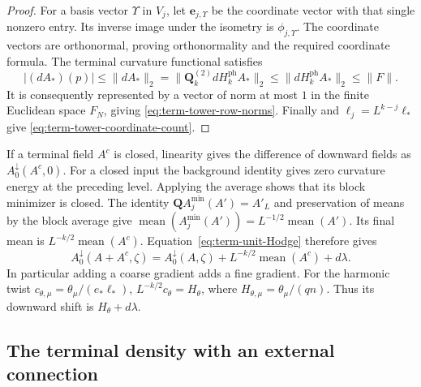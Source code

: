 \begin{proof}
For a basis vector $\Upsilon$ in $V_j$, let
$\mathbf e_{j,\Upsilon}$ be the coordinate vector
with that single nonzero entry.
Its inverse image under the isometry is
$\phi_{j,\Upsilon}$.
The coordinate vectors are orthonormal, proving
orthonormality and the required coordinate formula.
The terminal curvature functional satisfies
\[
 |(dA_*)(p)|
 \le\|dA_*\|_2
   =\|\mathbf Q_k^{(2)}dH_k^{\mathrm{ph}}A_*\|_2
 \le\|dH_k^{\mathrm{ph}}A_*\|_2\le\|F\|.
\]
It is consequently represented by a vector of norm
at most $1$ in the finite Euclidean space $F_N$,
giving \eqref{eq:term-tower-row-norms}.
Finally \cite[(19)]{MaxwellBlock} and
$\ell_j=L^{k-j}\ell_*$ give
\eqref{eq:term-tower-coordinate-count}.
\end{proof}


If a terminal field $A^c$ is closed, linearity gives
the difference of downward fields as
$A_0^\downarrow(A^c,0)$.
For a closed input the background identity
\cite[(30)]{MaxwellBlock} gives zero
curvature energy at the preceding level. Applying
the average shows that its block minimizer is closed.
The identity $\mathbf QA_j^{\min}(A')=A'_L$ and
preservation of means by the block average give
$\operatorname{mean}(A_j^{\min}(A'))=
L^{-1/2}\operatorname{mean}(A')$.
Its final mean is $L^{-k/2}\operatorname{mean}(A^c)$.
Equation~\eqref{eq:term-unit-Hodge} therefore gives
\begin{equation}\label{eq:term-closed-terminal-shift}
 A_0^\downarrow(A+A^c,\zeta)
    =A_0^\downarrow(A,\zeta)
        +L^{-k/2}\operatorname{mean}(A^c)+d\lambda .
\end{equation}
In particular adding a coarse gradient adds a fine
gradient. For the harmonic twist
$c_{\theta,\mu}=\theta_\mu/(e_*\ell_*)$,
$L^{-k/2}c_\theta=H_\theta$, where
$H_{\theta,\mu}=\theta_\mu/(qn)$.
Thus its downward shift is $H_\theta+d\lambda$.

\subsection{The terminal density with an external connection}
\label{subsec:term-density}

